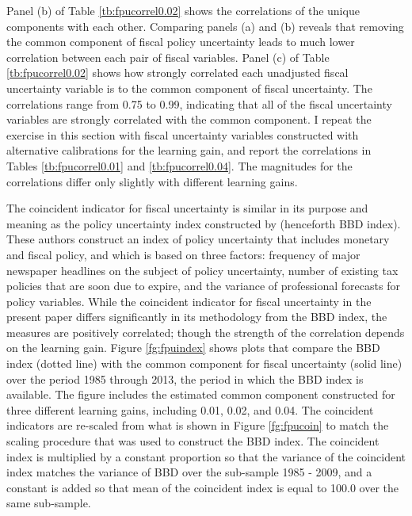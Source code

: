 \documentclass[11pt]{article}
\newcommand{\citee}[1]{\citet{#1}}
\begin{document}
Panel (b) of Table \ref{tb:fpucorrel0.02} shows the correlations of the unique components with each other.  Comparing panels (a) and (b) reveals that removing the common component of fiscal policy uncertainty leads to much lower correlation between each pair of fiscal variables.  Panel (c) of Table \ref{tb:fpucorrel0.02} shows how strongly correlated each unadjusted fiscal uncertainty variable is to the common component of fiscal uncertainty.  The correlations range from 0.75 to 0.99, indicating that all of the fiscal uncertainty variables are strongly correlated with the common component.  I repeat the exercise in this section with fiscal uncertainty variables constructed with alternative calibrations for the learning gain, and report the correlations in Tables \ref{tb:fpucorrel0.01} and \ref{tb:fpucorrel0.04}.  The magnitudes for the correlations differ only slightly with different learning gains. 

The coincident indicator for fiscal uncertainty is similar in its purpose and meaning as the policy uncertainty index constructed by \citee{baker2013} (henceforth BBD index).  These authors construct an index of policy uncertainty that includes monetary and fiscal policy, and which is based on three factors: frequency of major newspaper headlines on the subject of policy uncertainty, number of existing tax policies that are soon due to expire, and the variance of professional forecasts for policy variables.  While the coincident indicator for fiscal uncertainty in the present paper differs significantly in its methodology from the BBD index, the measures are positively correlated; though the strength of the correlation depends on the learning gain.  Figure \ref{fg:fpuindex} shows plots that compare the BBD index (dotted line) with the common component for fiscal uncertainty (solid line) over the period 1985 through 2013, the period in which the BBD index is available.  The figure includes the estimated common component constructed for three different learning gains, including 0.01, 0.02, and 0.04.  The coincident indicators are re-scaled from what is shown in Figure \ref{fg:fpucoin} to match the scaling procedure that was used to construct the BBD index.  The coincident index is multiplied by a constant proportion so that the variance of the coincident index matches the variance of BBD over the sub-sample 1985 - 2009, and a constant is added so that mean of the coincident index is equal to 100.0 over the same sub-sample.
\end{document}
